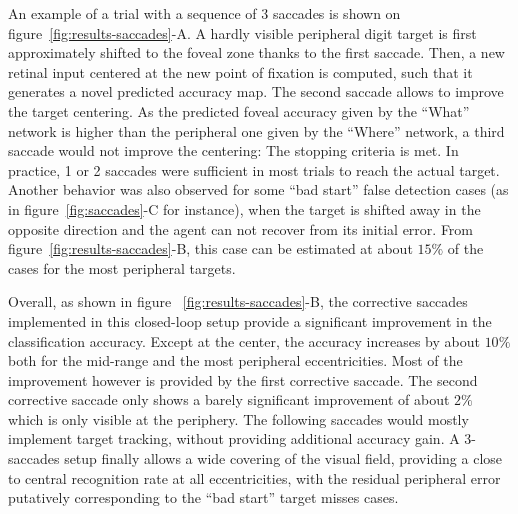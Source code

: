 An example of a trial with a sequence of 3 saccades is shown on figure~\ref{fig:results-saccades}-A. A hardly visible peripheral digit target is first approximately shifted to the foveal zone thanks to the first saccade. Then, a new retinal input centered at the new point of fixation is computed, such that it generates a novel predicted accuracy map. The second saccade allows to improve the target centering. As the predicted foveal accuracy given by the ``What'' network is higher than the peripheral one given by the ``Where'' network, a third saccade would not improve the centering: The stopping criteria is met.
In practice, 1 or 2 saccades were sufficient in most trials to reach the actual target.
Another behavior was also observed for some ``bad start'' false detection cases (as in figure~\ref{fig:saccades}-C for instance), when the target is shifted away in the opposite direction and the agent can not recover from its initial error. From figure~\ref{fig:results-saccades}-B, this case can be estimated at about $15\%$ of the cases for the most peripheral targets.

Overall, as shown in figure ~\ref{fig:results-saccades}-B, the corrective saccades implemented in this closed-loop setup provide a significant improvement in the classification accuracy. Except at the center, the accuracy increases by about $10\%$ both for the mid-range and the most peripheral eccentricities. Most of the improvement however is provided by the first corrective saccade. The second corrective saccade only shows a barely significant improvement of about $2\%$ which is only visible at the periphery. The following saccades would mostly implement target tracking, without providing additional accuracy gain. A 3-saccades setup finally allows a wide covering of the visual field, providing a close to central recognition rate at all eccentricities, with the residual peripheral error putatively corresponding to the ``bad start'' target misses cases.
